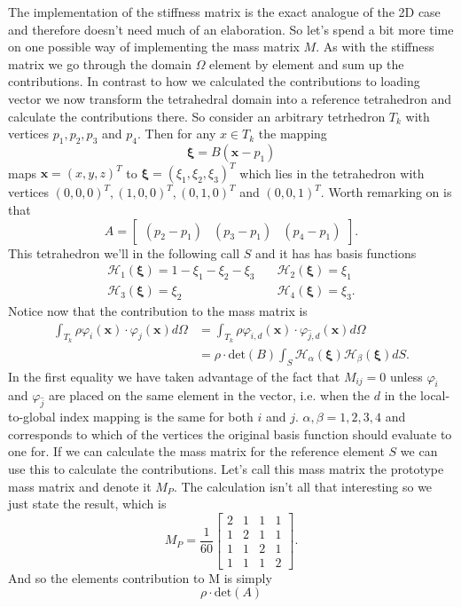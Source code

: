 \documentclass[paper=a4, fontsize=11pt]{scrartcl} %
\begin{document}
The implementation of the stiffness matrix is the exact analogue of the 2D case and therefore doesn't need much of an elaboration. So let's spend a bit more time on one possible way of implementing the mass matrix $M$. As with the stiffness matrix we go through the domain $\Omega$ element by element and sum up the contributions. In contrast to how we calculated the contributions to loading vector we now transform the tetrahedral domain into a reference tetrahedron and calculate the contributions there. So consider an arbitrary tetrhedron $T_k$ with vertices $p_1, p_2, p_3$ and $p_4$. Then for any $x\in T_k$ the mapping
\begin{equation*}
\boldsymbol{\xi} = B(\boldsymbol{x}-p_1)
\end{equation*}
maps $\boldsymbol{x}=(x,y,z)^T$ to $\boldsymbol{\xi}=(\xi_1,\xi_2,\xi_3)^T$ which lies in the tetrahedron with vertices $(0,0,0)^T,(1,0,0)^T,(0,1,0)^T$ and $(0,0,1)^T$. Worth remarking on is that
\begin{equation}
A = \begin{bmatrix}
(p_2 - p_1) & (p_3-p_1) & (p_4-p_1)
\end{bmatrix}.
\end{equation} This tetrahedron we'll in the following call $S$ and it has has basis functions
\begin{align*}
\mathcal{H}_1(\boldsymbol{\xi}) = 1-\xi_1-\xi_2 - \xi_3 &\quad \mathcal{H}_2(\boldsymbol{\xi}) = \xi_1 \\
\mathcal{H}_3(\boldsymbol{\xi}) = \xi_2 &\quad \mathcal{H}_4(\boldsymbol{\xi}) = \xi_3.
\end{align*}
Notice now that the contribution to the mass matrix is
\begin{align*}
\int_{T_k}\rho \varphi_i(\boldsymbol{x})\cdot \varphi_j(\boldsymbol{x})d\Omega &= \int_{T_k}\rho \varphi_{\hat{i},d}(\boldsymbol{x})\cdot \varphi_{\hat{j},d}(\boldsymbol{x})d\Omega \\
&= \rho\cdot \text{det}(B)\int_S\mathcal{H}_{\alpha}(\boldsymbol{\xi})\mathcal{H}_{\beta}(\boldsymbol{\xi})dS.
\end{align*}
In the first equality we have taken advantage of the fact that $M_{ij}=0$ unless $\varphi_{\hat{i}}$ and $\varphi_{\hat{j}}$ are placed on the same element in the vector, i.e. when the $d$ in the local-to-global index mapping is the same for both $i$ and $j$. $\alpha, \beta = 1,2,3,4$ and corresponds to which of the vertices the original basis function should evaluate to one for. If we can calculate the mass matrix for the reference element $S$ we can use this to calculate the contributions. Let's call this mass matrix the prototype mass matrix and denote it $M_P$. The calculation isn't all that interesting so we just state the result, which is
\begin{equation*}
M_P = \frac{1}{60}\begin{bmatrix}
2 & 1 & 1 & 1 \\
1 & 2 & 1 & 1 \\
1 & 1 & 2 & 1 \\
1 & 1 & 1 & 2
\end{bmatrix}.
\end{equation*}
And so the elements contribution to M is simply
\begin{equation}
\rho\cdot \text{det}(A)
\end{equation}
\end{document}
